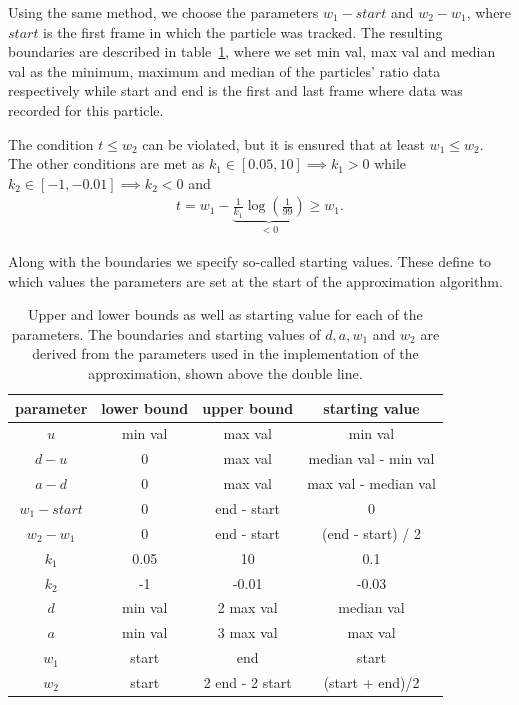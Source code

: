 Using the same method, we choose the parameters $w_1 - start$ and $w_2 - w_1$, where $start$ is the first frame in which the particle was tracked. The resulting boundaries are described in table~\ref{tab:boundaries_and_starting_vals}, where we set min val, max val and median val as the minimum, maximum and median of the particles' ratio data respectively while start and end is the first and last frame where data was recorded for this particle.

The condition $t \leq w_2$ can be violated, but it is ensured that at least $w_1 \leq w_2$. The other conditions are met as $k_1 \in [0.05, 10] \implies k_1 > 0$ while $k_2 \in [-1, -0.01] \implies k_2 < 0$ and
\begin{align*}
	t = w_1 - \underbrace{\frac{1}{k_1} \log(\frac{1}{99})}_{< 0} \geq w_1.
\end{align*}

Along with the boundaries we specify so-called starting values. These define to which values the parameters are set at the start of the approximation algorithm.

\begin{table}[h!]
	\centering
	\begin{tabular}{|c|c|c|c|}
		\hline
		\textbf{parameter} & \textbf{lower bound} & \textbf{upper bound} & \textbf{starting value} \\ 
		\hline
		\hline
		$u$ & min val & max val & min val\\
		\hline
		$d - u$ & 0 & max val & median val - min val\\
		\hline
		$a - d$ & 0 & max val & max val - median val\\
		\hline
		$w_1 - start$ & 0 & end - start & 0\\
		\hline
		$w_2 - w_1$ & 0 & end - start & (end - start) / 2\\
		\hline
		$k_1$ & 0.05 & 10 & 0.1\\
		\hline
		$k_2$ & -1 & -0.01 & -0.03\\
		\hline
		\hline
		$d$ & min val & 2 max val & median val \\
		\hline
		$a$ & min val & 3 max val & max val \\
		\hline
		$w_1$ & start & end & start \\
		\hline
		$w_2$ & start & 2 end - 2 start & (start + end)/2\\
		\hline
	\end{tabular}
	\caption{Upper and lower bounds as well as starting value for each of the parameters. The boundaries and starting values of $d, a, w_1$ and $w_2$ are derived from the parameters used in the implementation of the approximation, shown above the double line.}
	\label{tab:boundaries_and_starting_vals}
\end{table}

